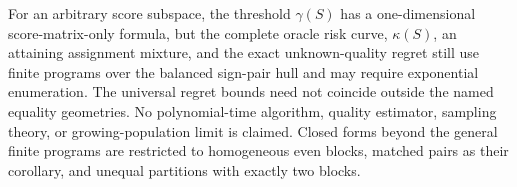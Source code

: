 For an arbitrary score subspace, the threshold \(\gamma(S)\) has a one-dimensional score-matrix-only formula, but the complete oracle risk curve, \(\kappa(S)\), an attaining assignment mixture, and the exact unknown-quality regret still use finite programs over the balanced sign-pair hull and may require exponential enumeration.  The universal regret bounds need not coincide outside the named equality geometries.  No polynomial-time algorithm, quality estimator, sampling theory, or growing-population limit is claimed.  Closed forms beyond the general finite programs are restricted to homogeneous even blocks, matched pairs as their corollary, and unequal partitions with exactly two blocks.